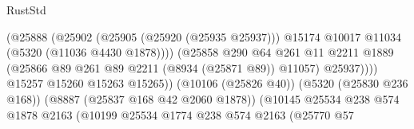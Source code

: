 \begin{lexlean}{RustStd}
\begin{coremodule}
                                                      (@25888
                                                        (@25902
                                                          (@25905 (@25920 (@25935 @25937)))
                                                          @15174
                                                          @10017
                                                          @11034
                                                          (@5320 (@11036 @4430 @1878))))
                                                      (@25858
                                                        @290
                                                        @64
                                                        @261
                                                        @11
                                                        @2211
                                                        @1889
                                                        (@25866
                                                          @89
                                                          @261
                                                          @89
                                                          @2211
                                                          (@8934 (@25871 @89))
                                                          @11057)
                                                        @25937))))
                                                @15257
                                                @15260
                                                @15263
                                                @15265))
                                            (@10106 (@25826 @40))
                                            (@5320 (@25830 @236 @168))
                                            (@8887 (@25837 @168 @42 @2060 @1878))
                                            (@10145
                                              @25534
                                              @238
                                              @574
                                              @1878
                                              @2163
                                              (@10199
                                                @25534
                                                @1774
                                                @238
                                                @574
                                                @2163
                                                (@25770
                                                  @57

\end{coremodule}
\end{lexlean}
